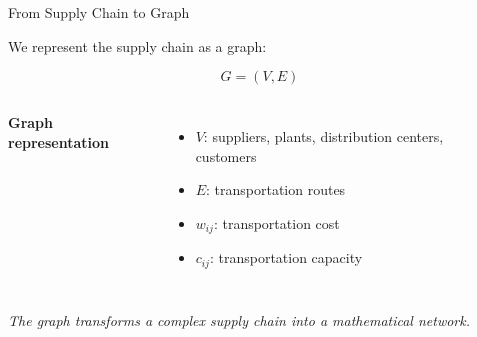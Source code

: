 \documentclass[aspectratio=169]{beamer}
\begin{document}
\begin{frame}{From Supply Chain to Graph}

We represent the supply chain as a graph:

\[
G=(V,E)
\]

\vspace{0.3cm}

\begin{columns}


\textbf{Graph representation}

\begin{itemize}
    \item $V$: suppliers, plants, distribution centers, customers
    \item $E$: transportation routes
    \item $w_{ij}$: transportation cost
    \item $c_{ij}$: transportation capacity
\end{itemize}


\begin{center}
\end{center}

\end{columns}

\vspace{0.5cm}

\begin{center}
\textit{The graph transforms a complex supply chain into a mathematical network.}
\end{center}

\end{frame}
\end{document}
